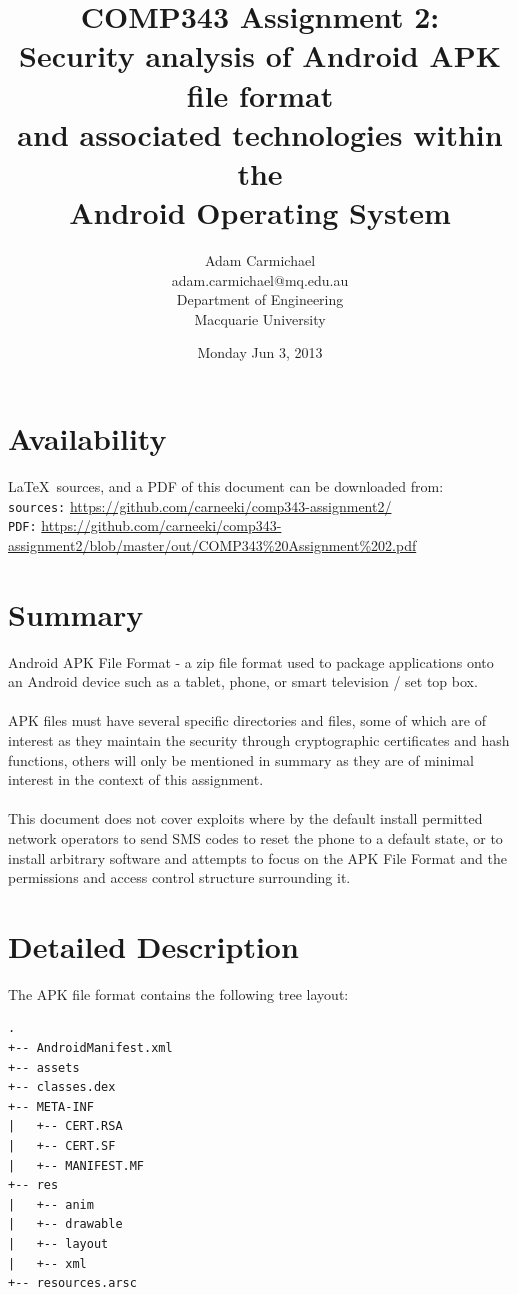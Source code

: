 \documentclass[a4paper]{article}
\begin{document}
\title{COMP343 Assignment 2:\\
Security analysis of Android APK file format \\
and associated technologies within the\\
Android Operating System}
\date{Monday Jun 3, 2013}
\author{Adam Carmichael \\
adam.carmichael@mq.edu.au \\
Department of Engineering \\
Macquarie University}
\maketitle

\tableofcontents

\section{Availability}
\LaTeX \, sources, and a PDF of this document can be downloaded from: \\
\texttt{sources:}
\url{https://github.com/carneeki/comp343-assignment2/} \\
\texttt{PDF:}
\url{https://github.com/carneeki/comp343-assignment2/blob/master/out/COMP343\%20Assignment\%202.pdf} 

\section{Summary}
Android APK File Format - a zip file format used to package applications onto an
Android device such as a tablet, phone, or smart television / set top box.
\\
\\
\noindent APK files must have several specific directories and files, some of
which are of interest as they maintain the security through cryptographic certificates and
hash functions, others will only be mentioned in summary as they are of minimal
interest in the context of this assignment.
\\
\\
\noindent This document does not cover exploits where by the default install permitted
network operators to send SMS codes to reset the phone to a default state, or to
install arbitrary software and attempts to focus on the APK File Format and the
permissions and access control structure surrounding it.

\section{Detailed Description}
The APK file format contains the following tree layout:
\begin{lstlisting}
.
+-- AndroidManifest.xml
+-- assets
+-- classes.dex
+-- META-INF
|   +-- CERT.RSA
|   +-- CERT.SF
|   +-- MANIFEST.MF
+-- res
|   +-- anim
|   +-- drawable
|   +-- layout
|   +-- xml
+-- resources.arsc
\end{lstlisting}
\end{document}
